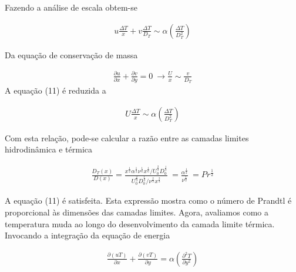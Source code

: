 \documentclass[12pt]{article}
\begin{document}
Fazendo a análise de escala obtem-se

\begin{equation}
	\begin{aligned}
		u\frac{\Delta T}{ x} + v\frac{\Delta T}{D_{T}} \sim \alpha\left( \frac{\Delta T}{D^{2}_{T}}\right)
	\end{aligned}
\end{equation}

Da equação de conservação de massa

\begin{equation}
	\begin{aligned}
		\frac{\partial u}{ \partial x} + \frac{\partial v}{\partial y} = 0 \ \rightarrow \frac{U}{x} \sim \frac{v}{D_{T}}
	\end{aligned}
\end{equation}
A equação (11) é reduzida a

\begin{equation}
	\begin{aligned}
		U\frac{\Delta T}{ x} \sim \alpha\left( \frac{\Delta T}{D^{2}_{T}}\right)
	\end{aligned}
\end{equation}

Com esta relação, pode-se calcular a razão entre as camadas limites hidrodinâmica e térmica

\begin{equation}
	\begin{aligned}
		\frac{D_{T}(x)}{D(x)} = \frac{x^{\frac{1}{2}}  \alpha^{\frac{1}{2}}  \nu^{\frac{1}{6}}   x^{\frac{1}{6}} / U^{\frac{2}{3}}_{0}  D^{\frac{1}{3}}_{0}  }         {U^{\frac{2}{3}}_{0}  D^{\frac{1}{3}}_{0}  / \nu^{\frac{2}{3}}   x^{\frac{2}{3}} } \ = \frac{\alpha^{\frac{1}{2}}}{\nu^{\frac{1}{2}}} \ = Pr^{\frac{1}{2}}
	\end{aligned}
\end{equation}

A equação (11) é satisfeita. Esta expressão mostra como o número de Prandtl é proporcional às dimensões das camadas limites. Agora, avaliamos como a temperatura muda ao longo do desenvolvimento da camada limite térmica. Invocando a integração da equação de energia

\begin{equation}
	\begin{aligned}
		\frac{\partial (uT)}{\partial x} + \frac{\partial (vT)}{\partial y} = \alpha\left( \frac{\partial^{2} T}{\partial y^{2}}\right)
	\end{aligned}
\end{equation}
\end{document}
